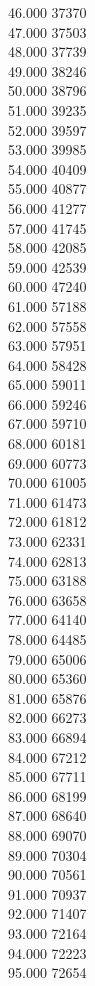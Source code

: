 { 46.000	37370 \\
 47.000	37503 \\
 48.000	37739 \\
 49.000	38246 \\
 50.000	38796 \\
 51.000	39235 \\
 52.000	39597 \\
 53.000	39985 \\
 54.000	40409 \\
 55.000	40877 \\
 56.000	41277 \\
 57.000	41745 \\
 58.000	42085 \\
 59.000	42539 \\
 60.000	47240 \\
 61.000	57188 \\
 62.000	57558 \\
 63.000	57951 \\
 64.000	58428 \\
 65.000	59011 \\
 66.000	59246 \\
 67.000	59710 \\
 68.000	60181 \\
 69.000	60773 \\
 70.000	61005 \\
 71.000	61473 \\
 72.000	61812 \\
 73.000	62331 \\
 74.000	62813 \\
 75.000	63188 \\
 76.000	63658 \\
 77.000	64140 \\
 78.000	64485 \\
 79.000	65006 \\
 80.000	65360 \\
 81.000	65876 \\
 82.000	66273 \\
 83.000	66894 \\
 84.000	67212 \\
 85.000	67711 \\
 86.000	68199 \\
 87.000	68640 \\
 88.000	69070 \\
 89.000	70304 \\
 90.000	70561 \\
 91.000	70937 \\
 92.000	71407 \\
 93.000	72164 \\
 94.000	72223 \\
 95.000	72654 \\
}
